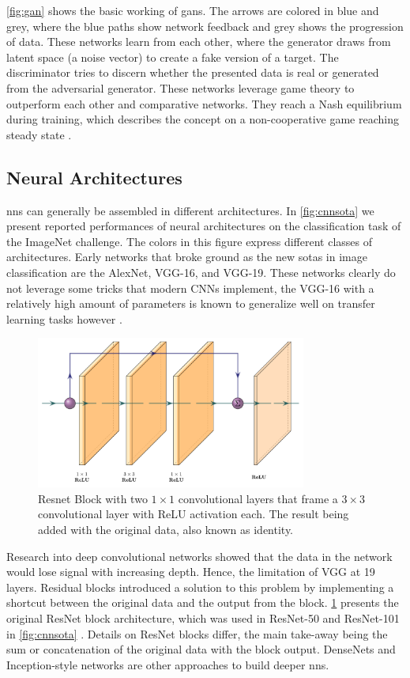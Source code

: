 \cref{fig:gan} shows the basic working of \acp{gan}. The arrows are colored in blue and grey, where the blue paths show network feedback and grey shows the progression of data. These networks learn from each other, where the generator draws from latent space (a noise vector) to create a fake version of a target. The discriminator tries to discern whether the presented data is real or generated from the adversarial generator. These networks leverage game theory to outperform each other and comparative networks. They reach a Nash equilibrium during training, which describes the concept on a non-cooperative game reaching steady state \citep{nash1951non}. 

\subsection{Neural Architectures}
\aclp{nn} can generally be assembled in different architectures. In \cref{fig:cnnsota} we present reported performances of neural architectures on the classification task of the ImageNet challenge. The colors in this figure express different classes of architectures. Early networks that broke ground as the new \aclp{sota} in image classification are the AlexNet, VGG-16, and VGG-19. These networks clearly do not leverage some tricks that modern CNNs implement, the VGG-16 with a relatively high amount of parameters is known to generalize well on transfer learning tasks however \citep{dramsch2018deep}. 

\begin{figure}[H]
    \centering
    \includegraphics[width=\textwidth,height=5cm,keepaspectratio]{figures/resnet.pdf}
    \caption{Resnet Block with two $1\times1$ convolutional layers that frame a $3\times3$ convolutional layer with ReLU activation each. The result being added with the original data, also known as identity.}
    \label{fig:resnet}
\end{figure}

Research into deep convolutional networks showed that the data in the network would lose signal with increasing depth. Hence, the limitation of VGG at 19 layers. Residual blocks introduced a solution to this problem by implementing a shortcut between the original data and the output from the block. \cref{fig:resnet} presents the original ResNet block architecture, which was used in ResNet-50 and ResNet-101 in \cref{fig:cnnsota} \citep{he2016deep}. Details on ResNet blocks differ, the main take-away being the sum or concatenation of the original data with the block output. DenseNets \citep{huang2017densely} and Inception-style networks \citep{szegedy2015going} are other approaches to build deeper \acp{nn}.


